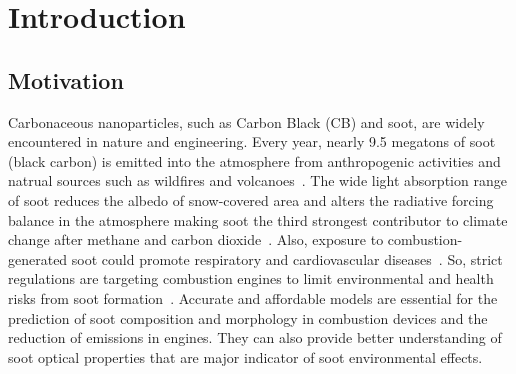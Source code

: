 \chapter{Introduction}

\section{Motivation}
Carbonaceous nanoparticles, such as Carbon Black (CB) and soot, are widely encountered in nature and engineering. Every year, nearly 9.5 megatons of soot (black carbon) is emitted into the atmosphere from anthropogenic activities and natrual sources such as wildfires and volcanoes~\citep{myhre2014anthropogenic}. The wide light absorption range of soot reduces the albedo of snow-covered area and alters the radiative forcing balance in the atmosphere making soot the third strongest contributor to climate change after methane and carbon dioxide~\citep{myhre2014anthropogenic}. Also, exposure to combustion-generated soot could promote respiratory and cardiovascular diseases~\citep{world2013health}. So, strict regulations are targeting combustion engines to limit environmental and health risks from soot formation~\citep{integrated2019}. Accurate and affordable models are essential for the prediction of soot composition and morphology in combustion devices and the reduction of emissions in engines. They can also provide better understanding of soot optical properties that are major indicator of soot environmental effects.

